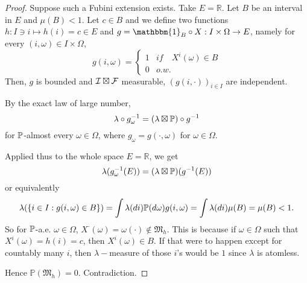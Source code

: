 \begin{proof}
	Suppose such a Fubini extension exists. Take $E = \mathbb{R}$. Let $B$ be an interval in $E$ and $\mu(B) < 1$. Let $c \in B$ and we define two functions $h: I \ni i \mapsto h(i) = c \in E$ and $g = \mathbbm{1}_B \circ X : I \times \Omega \to E$, namely for every $(i,\omega) \in I \times \Omega$,
	$$
		g(i,\omega) = 
		\left\{
		\begin{array}{cl}
			1 & if \quad X^{i}(\omega) \in B \\
			0 & o.w.
		\end{array}
		\right.
	$$
	Then, $g$ is bounded and ${\cal I} \boxtimes {\cal F}$ measurable, $(g(i,\cdot))_{i\in I}$ are independent.
	
	By the exact law of large number,
	$$
		\lambda \circ g^{-1}_\omega = (\lambda \boxtimes \mathbb{P}) \circ g^{-1}
	$$
	for $\mathbb{P}$-almost every $\omega \in \Omega$, where $g_\omega = g(\cdot, \omega)$ for $\omega \in \Omega$.
	
	Applied thus to the whole space $E = \mathbb{R}$, we get
	$$
		\lambda(g_\omega^{-1}(E)) =  (\lambda \boxtimes \mathbb{P})(g^{-1}(E))
	$$
	or equivalently
	$$
		\lambda(\{i\in I: g(i,\omega) \in B \}) = \int \lambda(di) \mathbb{P}(d\omega)g(i,\omega) = \int \lambda(di) \mu(B) = \mu(B) < 1.
	$$
	So for $\mathbb{P}$-a.e. $\omega \in \Omega$, $X^{\cdot}(\omega) = \omega(\cdot) \notin \mathfrak{M}_h$. This is because if $\omega \in \Omega$ such that $X^i(\omega) = h(i) = c$, then 
	$X^i(\omega) \in B$. If that were to happen except for countably many $i$, then $\lambda-$measure of those $i$'s would be $1$ since $\lambda$ is atomless.
	
	Hence $\mathbb{P}(\mathfrak{M}_h) = 0$. Contradiction.	
\end{proof}



